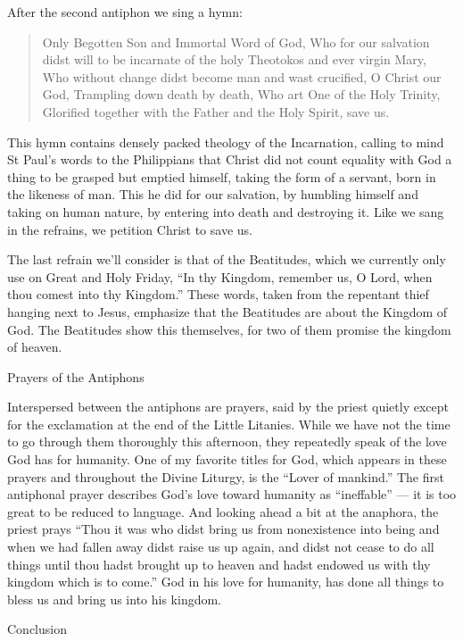 \documentclass[
]{article}
\begin{document}
After the second antiphon we sing a hymn:

\begin{quote}
Only Begotten Son and Immortal Word of God, Who for our salvation didst
will to be incarnate of the holy Theotokos and ever virgin Mary,\\
Who without change didst become man and wast crucified, O Christ our
God, Trampling down death by death, Who art One of the Holy Trinity,
Glorified together with the Father and the Holy Spirit, save us.
\end{quote}

This hymn contains densely packed theology of the Incarnation, calling
to mind St Paul's words to the Philippians that Christ did not count
equality with God a thing to be grasped but emptied himself, taking the
form of a servant, born in the likeness of man. This he did for our
salvation, by humbling himself and taking on human nature, by entering
into death and destroying it. Like we sang in the refrains, we petition
Christ to save us.

The last refrain we'll consider is that of the Beatitudes, which we
currently only use on Great and Holy Friday, ``In thy Kingdom, remember
us, O Lord, when thou comest into thy Kingdom.'' These words, taken from
the repentant thief hanging next to Jesus, emphasize that the Beatitudes
are about the Kingdom of God. The Beatitudes show this themselves, for
two of them promise the kingdom of heaven.

Prayers of the Antiphons

Interspersed between the antiphons are prayers, said by the priest
quietly except for the exclamation at the end of the Little Litanies.
While we have not the time to go through them thoroughly this afternoon,
they repeatedly speak of the love God has for humanity. One of my
favorite titles for God, which appears in these prayers and throughout
the Divine Liturgy, is the ``Lover of mankind.'' The first antiphonal
prayer describes God's love toward humanity as ``ineffable'' --- it is
too great to be reduced to language. And looking ahead a bit at the
anaphora, the priest prays ``Thou it was who didst bring us from
nonexistence into being and when we had fallen away didst raise us up
again, and didst not cease to do all things until thou hadst brought up
to heaven and hadst endowed us with thy kingdom which is to come.'' God
in his love for humanity, has done all things to bless us and bring us
into his kingdom.

Conclusion
\end{document}
